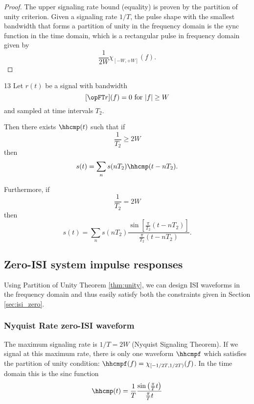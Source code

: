 \begin{proof}
The upper signaling rate bound (equality) is proven by the
partition of unity criterion.
Given a signaling rate $1/T$, the pulse shape with the smallest
bandwidth that forms a partition of unity in the frequency domain
is the sync function in the time domain,
which is a rectangular pulse in frequency domain given by
\[ \frac{1}{2W} \chi_{[-W,+W]}(f). \]
\end{proof}

\begin{theorem}
\citep{proakis}{13}
\label{thm:sst}
Let $r(t)$ be a signal with bandwidth
         \[ [\opFT r](f) = 0 \mbox{ for } |f|\ge W  \]
and sampled at time intervals $T_2$.

Then there exists $\hhcmp(t)$ such that if
   \[  \frac{1}{T_2} \ge 2W \]
then
   \[ s(t) = \sum_n s(nT_2) \hhcmp(t-nT_2). \]

Furthermore, if
   \[  \frac{1}{T_2} = 2W \]
then
   \[
      s(t) = \sum_n s(nT_2) \frac{\sin\left[ \frac{\pi}{T_2}(t-nT_2) \right]}
                               {           \frac{\pi}{T_2}(t-nT_2)}.
   \]
\end{theorem}


\subsection{Zero-ISI system impulse responses}
Using Partition of Unity Theorem \ref{thm:unity},
we can design ISI waveforms in the frequency domain and thus
easily satisfy both the constraints given in Section \ref{sec:isi_zero}.

\subsubsection{Nyquist Rate zero-ISI waveform}
The maximum signaling rate is $1/T=2W$ (Nyquist Signaling Theorem).
If we signal at this maximum rate, there is only one waveform $\hhcmpf$
which satisfies the partition of unity condition:
$\hhcmpf(f) = \chi_{[-1/2T,1/2T)}(f)$.
In the time domain this is the sinc function
\[
   \hhcmp(t)=\frac{1}{T} \frac{\sin\left(\frac{\pi}{T}t\right)}{\frac{\pi}{T}t}
\]


